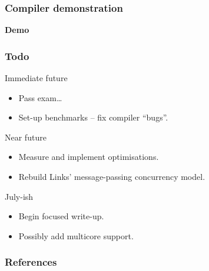\documentclass[10pt,compress]{beamer}
\begin{document}
\begin{frame}
  \frametitle{Compiler demonstration}
  \begin{center}
    {\Huge\textbf{Demo}}
  \end{center}
\end{frame}

\begin{frame}
  \frametitle{Todo}
  Immediate future
  \begin{itemize}
    \item Pass exam\dots
    \item Set-up benchmarks -- fix compiler ``bugs''.
  \end{itemize}
  Near future
  \begin{itemize}
    \item Measure and implement optimisations.   
    \item Rebuild Links' message-passing concurrency model.
  \end{itemize}
  July-ish
  \begin{itemize}
    \item Begin focused write-up.
    \item Possibly add multicore support.
  \end{itemize}
\end{frame}

\begin{frame}
  \frametitle{References}
  
  
\end{frame}
\end{document}
